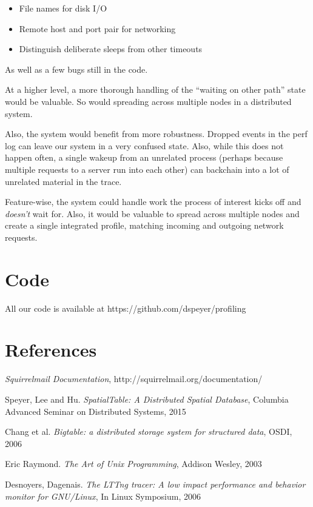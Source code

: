 \documentclass[10pt]{article}
\begin{document}
\begin{itemize}
\item File names for disk I/O
\item Remote host and port pair for networking
\item Distinguish deliberate sleeps from other timeouts
\end{itemize}

As well as a few bugs still in the code.

At a higher level, a more thorough handling of the ``waiting on other path'' state would be valuable.  So would spreading across multiple nodes in a distributed system.

Also, the system would benefit from more robustness.  Dropped events in the perf log can leave our system in a very confused state.  Also, while this does not happen often, a single wakeup from an unrelated process (perhaps because multiple requests to a server run into each other) can backchain into a lot of unrelated material in the trace.

Feature-wise, the system could handle work the process of interest kicks off and \emph{doesn't} wait for.  Also, it would be valuable to spread across multiple nodes and create a single integrated profile, matching incoming and outgoing network requests.

\section{Code}

All our code is available at https://github.com/dspeyer/profiling

\section{References}

\begin{thebibliography}{9}

  \emph{Squirrelmail Documentation},
  http://squirrelmail.org/documentation/

  Speyer, Lee and Hu.
  \emph{SpatialTable: A Distributed Spatial Database},
  Columbia Advanced Seminar on Distributed Systems,
  2015

  Chang et al.
  \emph{Bigtable: a distributed storage system for structured data},
  OSDI,
  2006

  Eric Raymond.
  \emph{The Art of Unix Programming},
  Addison Wesley,
  2003

  Desnoyers, Dagenais.
  \emph{The LTTng tracer: A low impact performance and behavior monitor for
  GNU/Linux},
   In Linux Symposium,
   2006

\end{thebibliography}
\end{document}
